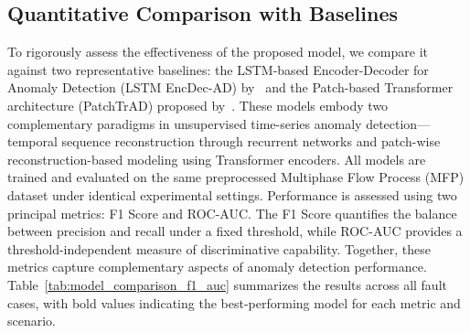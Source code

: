 \documentclass{article}
\begin{document}
\subsection{Quantitative Comparison with Baselines}\label{sec:model_comparison}
To rigorously assess the effectiveness of the proposed model, we compare it against two representative baselines: the LSTM-based Encoder-Decoder for Anomaly Detection (LSTM EncDec-AD) by~\citep{malhotra_ramakrishnan_anand_vig_agarwal_shroff_2016} and the Patch-based Transformer architecture (PatchTrAD) proposed by~\citep{vilhes_gasso_alaya_2025}. These models embody two complementary paradigms in unsupervised time-series anomaly detection—temporal sequence reconstruction through recurrent networks and patch-wise reconstruction-based modeling using Transformer encoders. All models are trained and evaluated on the same preprocessed Multiphase Flow Process (MFP) dataset under identical experimental settings.
Performance is assessed using two principal metrics: F1 Score and ROC-AUC. The F1 Score quantifies the balance between precision and recall under a fixed threshold, while ROC-AUC provides a threshold-independent measure of discriminative capability. Together, these metrics capture complementary aspects of anomaly detection performance. Table~\ref{tab:model_comparison_f1_auc} summarizes the results across all fault cases, with bold values indicating the best-performing model for each metric and scenario.
\end{document}
